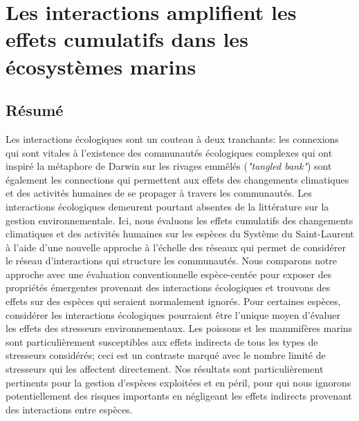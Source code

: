 \chapter{Les interactions amplifient les effets cumulatifs dans les écosystèmes marins}
\label{chap5}

\section{Résumé}

Les interactions écologiques sont un couteau à deux tranchants: les connexions qui sont vitales à l’existence des communautés écologiques complexes qui ont inspiré la métaphore de Darwin sur les rivages emmêlés (\textit{"tangled bank"}) sont également les connections qui permettent aux effets des changements climatiques et des activités humaines de se propager à travers les communautés. Les interactions écologiques demeurent pourtant absentes de la littérature sur la gestion environnementale. Ici, nous évaluons les effets cumulatifs des changements climatiques et des activités humaines sur les espèces du Système du Saint-Laurent à l’aide d’une nouvelle approche à l’échelle des réseaux qui permet de considérer le réseau d’interactions qui structure les communautés. Nous comparons notre approche avec une évaluation conventionnelle espèce-centée pour exposer des propriétés émergentes provenant des interactions écologiques et trouvons des effets sur des espèces qui seraient normalement ignorés. Pour certaines espèces, considérer les interactions écologiques pourraient être l’unique moyen d’évaluer les effets des stresseurs environnementaux. Les poissons et les mammifères marins sont particulièrement susceptibles aux effets indirects de tous les types de stresseurs considérés; ceci est un contraste marqué avec le nombre limité de stresseurs qui les affectent directement. Nos résultats sont particulièrement pertinents pour la gestion d’espèces exploitées et en péril, pour qui nous ignorons potentiellement des risques importants en négligeant les effets indirects provenant des interactions entre espèces.

